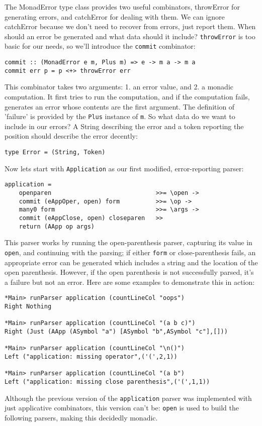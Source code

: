 \documentclass{tmr}
\begin{document}
The MonadError type class provides two useful combinators, throwError for 
generating errors, and catchError for dealing with them.  We can ignore 
catchError because we don't need to recover from errors, just report them. 
When should an error be generated and what 
data should it include?  \verb+throwError+ is too basic for our needs, so we'll 
introduce the \verb+commit+ combinator:
\begin{verbatim}
commit :: (MonadError e m, Plus m) => e -> m a -> m a
commit err p = p <+> throwError err
\end{verbatim}
This combinator takes two arguments: 1. an error value, and 2. a monadic 
computation.  It first tries to run the computation, and if the computation 
fails, generates an error whose contents are the first argument.  The 
definition of 'failure' is provided by the \verb+Plus+ instance of \verb+m+. So 
what data do we want to include in our errors?  A String describing the error 
and a token reporting the position should describe the error decently:
\begin{verbatim}
type Error = (String, Token)
\end{verbatim}
Now lets start with \verb+Application+ as our first modified, error-reporting parser:
\begin{verbatim}
application =
    openparen                             >>= \open ->
    commit (eAppOper, open) form          >>= \op ->
    many0 form                            >>= \args ->
    commit (eAppClose, open) closeparen   >>
    return (AApp op args)
\end{verbatim}
This parser works by running the open-parenthesis parser, capturing its value 
in \verb+open+, and continuing with the parsing; if either \verb+form+ or 
close-parenthesis fails, an appropriate error can be generated which includes 
a string and the location of the open parenthesis.  However, if the open 
parenthesis is not successfully parsed, it's a failure but not an error.  
Here are some examples to demonstrate this in action:
\begin{verbatim}
*Main> runParser application (countLineCol "oops")
Right Nothing

*Main> runParser application (countLineCol "(a b c)")
Right (Just (AApp (ASymbol "a") [ASymbol "b",ASymbol "c"],[]))

*Main> runParser application (countLineCol "\n()")
Left ("application: missing operator",('(',2,1))

*Main> runParser application (countLineCol "(a b")
Left ("application: missing close parenthesis",('(',1,1))
\end{verbatim}
Although the previous version of the \verb+application+ parser was implemented 
with just applicative combinators, this version can't be:  \verb+open+ 
is used to build the following parsers, making this decidedly monadic.
\end{document}
